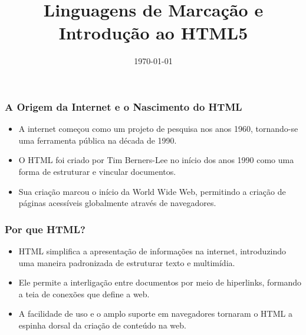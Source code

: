 \title{Linguagens de Marcação e Introdução ao HTML5}
\date{\today}
\frame{\titlepage}

\begin{frame}[fragile]
  \frametitle{A Origem da Internet e o Nascimento do HTML}
  \begin{itemize}
    \item A internet começou como um projeto de pesquisa nos anos 1960, tornando-se uma ferramenta pública na década de 1990.
    \item O HTML foi criado por Tim Berners-Lee no início dos anos 1990 como uma forma de estruturar e vincular documentos.
    \item Sua criação marcou o início da World Wide Web, permitindo a criação de páginas acessíveis globalmente através de navegadores.
  \end{itemize}
\end{frame}

\begin{frame}[fragile]
  \frametitle{Por que HTML?}
  \begin{itemize}
    \item HTML simplifica a apresentação de informações na internet, introduzindo uma maneira padronizada de estruturar texto e multimídia.
    \item Ele permite a interligação entre documentos por meio de hiperlinks, formando a teia de conexões que define a web.
    \item A facilidade de uso e o amplo suporte em navegadores tornaram o HTML a espinha dorsal da criação de conteúdo na web.
  \end{itemize}
\end{frame}

